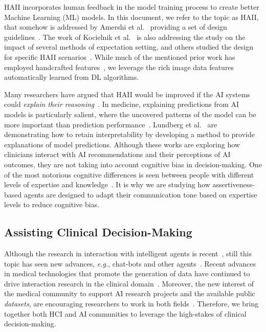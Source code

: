 HAII incorporates human feedback in the model training process to create better Machine Learning (ML) models.
In this document, we refer to the topic as HAII, that somehow is addressed by Amershi et al.~\cite{10.1145/3290605.3300233} providing a set of design guidelines~\cite{10.1145/3132272.3134111}.
The work of Kocielnik et al.~\cite{Kocielnik:2019:YAI:3290605.3300641} is also addressing the study on the impact of several methods of expectation setting, and others studied the design for specific HAII scenarios~\cite{aha2017ai}.
While much of the mentioned prior work has employed handcrafted features~\cite{10.1145/3290605.3300233, Kocielnik:2019:YAI:3290605.3300641}, we leverage the rich image data features automatically learned from DL algorithms.

Many researchers have argued that HAII would be improved if the AI systems could {\it explain their reasoning}~\cite{10.1145/3411764.3445717, Rudin2022, Kawamleh2022}.
In medicine, explaining predictions from AI models is particularly salient, where the uncovered patterns of the model can be more important than prediction performance~\cite{Lundberg2020}.
Lundberg et al.~\cite{Lundberg2018} are demonstrating how to retain interpretability by developing a method to provide explanations of model predictions.
Although these works are exploring how clinicians interact with AI recommendations and their perceptions of AI outcomes, they are not taking into account cognitive bias in decision-making.
One of the most notorious cognitive differences is seen between people with different levels of expertise and knowledge~\cite{https://doi.org/10.1111/nuf.12430, Seidel2021}.
It is why we are studying how assertiveness-based agents are designed to adapt their communication tone based on expertise levels to reduce cognitive bias.

\subsection{Assisting Clinical Decision-Making}
\label{sec:chap006002002}

Although the research in interaction with intelligent agents is recent~\cite{burr2018analysis}, still this topic has seen new advances, {\it e.g.}, chat-bots and other agents~\cite{miller2019intrinsically}.
Recent advances in medical technologies that promote the generation of data have continued to drive interaction research in the clinical domain~\cite{azuaje2019artificial, Lopes:2017:UHC:3143820.3144118}.
Moreover, the new interest of the medical community to support AI research projects and the available public {\it datasets}, are encouraging researchers to work in both fields~\cite{lau2018dataset}.
Therefore, we bring together both HCI and AI communities to leverage the high-stakes of clinical decision-making.

